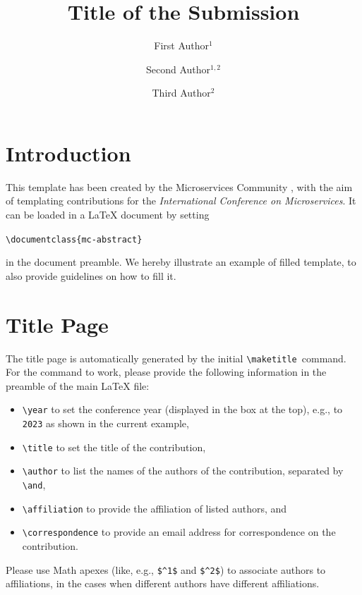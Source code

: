 \documentclass{mc-abstract}
\title{Title of the Submission}
\author{First Author$^1$ \and Second Author$^{1,2}$ \and Third Author$^2$}
\affiliation{
    $^1$ First Affiliation, First City, First Country \\ 
    $^2$ Second Affiliation, Second City, Second Country
}
\begin{document}
\maketitle


\section{Introduction}
This template has been created by the Microservices Community \cite{MicroservicesCommunity}, with the aim of templating contributions for the \textit{International Conference on Microservices}. 
It can be loaded in a \LaTeX{} document by setting
\begin{center}
    \verb|\documentclass{mc-abstract}|
\end{center}
in the document preamble.
We hereby illustrate an example of filled template, to also provide guidelines on how to fill it.

\section{Title Page}
The title page is automatically generated by the initial \verb|\maketitle| command. For the command to work, please provide the following information in the preamble of the main \LaTeX{} file: 
\begin{itemize}
    \item \verb|\year| to set the conference year (displayed in the box at the top), e.g., to \verb|2023| as shown in the current example,
    \item \verb|\title| to set the title of the contribution,
    \item \verb|\author| to list the names of the authors of the contribution, separated by \verb|\and|, 
    \item \verb|\affiliation| to provide the affiliation of listed authors, and
    \item \verb|\correspondence| to provide an email address for correspondence on the contribution.
\end{itemize}
Please use Math apexes (like, e.g., \verb|$^1$| and \verb|$^2$|) to associate authors to affiliations, in the cases when different authors have different affiliations.
\end{document}

